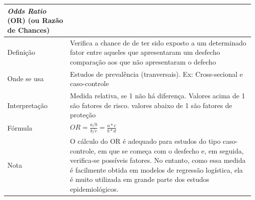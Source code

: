 \documentclass[
]{book}
\begin{document}
\begin{longtable}[]{@{}ll@{}}
\toprule
\begin{minipage}[b]{0.22\columnwidth}\raggedright
\emph{Odds Ratio} (OR) (ou Razão de Chances)\strut
\end{minipage} & \begin{minipage}[b]{0.72\columnwidth}\raggedright
\strut
\end{minipage}\tabularnewline
\midrule
\endhead
\begin{minipage}[t]{0.22\columnwidth}\raggedright
Definição\strut
\end{minipage} & \begin{minipage}[t]{0.72\columnwidth}\raggedright
Verifica a chance de de ter sido exposto a um determinado fator entre aqueles que apresentaram um desfecho comparação aos que não apresentaram o defecho\strut
\end{minipage}\tabularnewline
\begin{minipage}[t]{0.22\columnwidth}\raggedright
Onde se usa\strut
\end{minipage} & \begin{minipage}[t]{0.72\columnwidth}\raggedright
Estudos de prevalência (tranversais). Ex: Cross-secional e caso-controle\strut
\end{minipage}\tabularnewline
\begin{minipage}[t]{0.22\columnwidth}\raggedright
Interpretação\strut
\end{minipage} & \begin{minipage}[t]{0.72\columnwidth}\raggedright
Medida relativa, se 1 não há diferença. Valores acima de 1 são fatores de risco. valores abaixo de 1 são fatores de proteção\strut
\end{minipage}\tabularnewline
\begin{minipage}[t]{0.22\columnwidth}\raggedright
Fórmula\strut
\end{minipage} & \begin{minipage}[t]{0.72\columnwidth}\raggedright
\(OR = \frac{a/b}{b/c}=\frac{a*c}{b*d}\)\strut
\end{minipage}\tabularnewline
\begin{minipage}[t]{0.22\columnwidth}\raggedright
Nota\strut
\end{minipage} & \begin{minipage}[t]{0.72\columnwidth}\raggedright
O cálculo do OR é adequado para estudos do tipo caso-controle, em que se começa com o desfecho e, em seguida, verifica-se possíveis fatores. No entanto, como essa medida é facilmente obtida em modelos de regressão logística, ela é muito utilizada em grande parte dos estudos epidemiológicos.\strut
\end{minipage}\tabularnewline
\bottomrule
\end{longtable}
\end{document}
